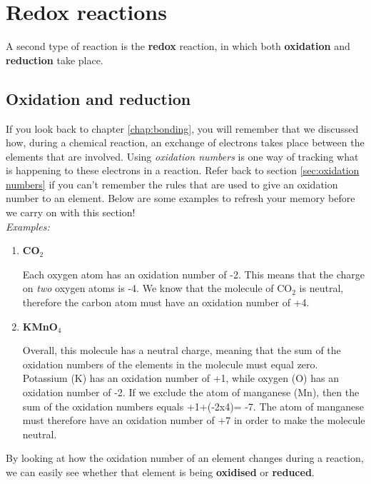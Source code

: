 
\section{Redox reactions}
\label{sec:reactiontypes:redox}

A second type of reaction is the \textbf{redox} reaction, in which both \textbf{oxidation} and \textbf{reduction} take place.

\subsection{Oxidation and reduction}

If you look back to chapter \ref{chap:bonding}, you will remember that we discussed how, during a chemical reaction, an exchange of electrons takes place between the elements that are involved. Using \textit{oxidation numbers} is one way of tracking what is happening to these electrons in a reaction. Refer back to section \ref{sec:oxidation numbers} if you can't remember the rules that are used to give an oxidation number to an element. Below are some examples to refresh your memory before we carry on with this section!\\

\textit{Examples:}

\begin{enumerate}
\item{\textbf{CO$_{2}$}

Each oxygen atom has an oxidation number of -2. This means that the charge on \textit{two} oxygen atoms is -4. We know that the molecule of CO$_{2}$ is neutral, therefore the carbon atom must have an oxidation number of +4.}

\item{\textbf{KMnO$_{4}$}

Overall, this molecule has a neutral charge, meaning that the sum of the oxidation numbers of the elements in the molecule must equal zero. Potassium (K) has an oxidation number of +1, while oxygen (O) has an oxidation number of -2. If we exclude the atom of manganese (Mn), then the sum of the oxidation numbers equals +1+(-2x4)= -7. The atom of manganese must therefore have an oxidation number of +7 in order to make the molecule neutral.\\
}
\end{enumerate}

By looking at how the oxidation number of an element changes during a reaction, we can easily see whether that element is being \textbf{oxidised} or \textbf{reduced}.

